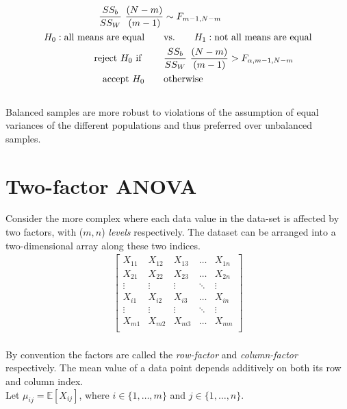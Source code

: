 \begin{align}
	\frac{SS_b}{SS_W}\ \frac{(N-m)}{(m-1)} &\sim F_{m-1, N-m} \nonumber \\
	H_0 : \text{all means are equal} \qquad &\text{vs.} \qquad H_1 : \text{not all means are equal} \nonumber \\
	\text{reject $ H_0 $ if } \qquad & \frac{SS_b}{SS_W}\ \frac{(N-m)}{(m-1)} > F_{\alpha, m-1, N-m}  \nonumber \\
	\text{accept $ H_0 $} \qquad & \text{otherwise}
\end{align}\\

Balanced samples are more robust to violations of the assumption of equal variances of the different populations and thus preferred over unbalanced samples.\\

\section{Two-factor ANOVA}

Consider the more complex where each data value in the data-set is affected by two factors, with ($ m, n $) \textit{levels} respectively. The dataset can be arranged into a two-dimensional array along these two indices.\\

\begin{align}
	\begin{bmatrix}
		X_{11} & X_{12} & X_{13} & \dots & X_{1n} \\
		X_{21} & X_{22} & X_{23} & \dots & X_{2n} \\
		\vdots & \vdots & \vdots & \ddots & \vdots \\
		X_{i1} & X_{i2} & X_{i3} & \dots & X_{in} \\
		\vdots & \vdots & \vdots & \ddots & \vdots \\
		X_{m1} & X_{m2} & X_{m3} & \dots & X_{mn} \\
	\end{bmatrix}
\end{align}\\

By convention the factors are called the \textit{row-factor} and \textit{column-factor} respectively. The mean value of a data point depends additively on both its row and column index.\\

Let $ \mu_{ij} = \mathbb{E}[X_{ij}] $, where $ i \in \{1, \dots, m\} $ and $ j \in \{1, \dots, n\} $.\\

